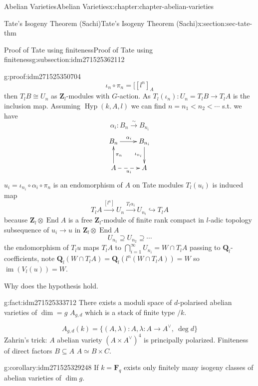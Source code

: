 \documentclass[oneside,10pt,]{book}
\numberwithin{equation}{section}
\newcommand{\lb}{[}
\newcommand{\ZZ}{\mathbf{Z}}
\newcommand{\QQ}{\mathbf{Q}}
\newcommand{\FF}{\mathbf{F}}
\DeclareMathOperator{\End}{End}
\DeclareMathOperator{\im}{im}
\newcommand{\lt}{<}
\begin{document}
\begin{chapterptx}{Abelian Varieties}{}{Abelian Varieties}{}{}{x:chapter:chapter-abelian-varieties}
\begin{sectionptx}{Tate's Isogeny Theorem (Sachi)}{}{Tate's Isogeny Theorem (Sachi)}{}{}{x:section:sec-tate-thm}
\begin{subsectionptx}{Proof of Tate using finiteness}{}{Proof of Tate using finiteness}{}{}{g:subsection:idm271525362112}
\begin{proofptx}{}{g:proof:idm271525350704}
\begin{equation*}
\iota_n \circ \pi_n  =  \lb [l^n]_A
\end{equation*}
then \(T_lB \cong U_n\) as \(\ZZ_l\)-modules with \(G\)-action. As \(T_l(\iota_n) \colon U_n =T_l B  \to T_l A\) is the inclusion map. Assuming \(\operatorname{Hyp}(k,A,l)\) we can find \(n = n_1 \lt n_2 \lt \cdots\) s.t. we have%
\begin{equation*}
\alpha_i \colon B_n \xrightarrow{\sim} B_{n_i}
\end{equation*}
%
\begin{equation*}
\xymatrix{
B_n \ar[r]^{\alpha_i} & B_{n_i} \ar[d]_{\iota_{n_i}}\\
A\ar[u]_{\pi_n} \ar@{-->}_{u_i}[r] & A
}
\end{equation*}
\(u_i = \iota_{n_i} \circ \alpha_i \circ \pi_n\) is an endomorphism of \(A\) on Tate modules \(T_l(u_i)\) is induced map%
\begin{equation*}
T_l A \xrightarrow{[l^n]} U_n \xrightarrow{T_l\alpha_i} U_{n_i} \hookrightarrow T_l A
\end{equation*}
because \(\ZZ_l \otimes \End A\) is a free \(\ZZ_l\)-module of finite rank compact in \(l\)-adic topology subsequence of \(u_i \to u\) in \(\ZZ_l \otimes \End A\)%
\begin{equation*}
U_{n_1} \supseteq U_{n_2} \supseteq \cdots
\end{equation*}
the endomorphism of \(T_l u\) maps \(T_l A\) to \(\bigcap_{i=1}^\infty U_{n_i} = W\cap T_l A\) passing to \(\QQ_l\)-coefficients, note \(\QQ_l(W\cap T_l A) = \QQ_l(l^n(W\cap T_l A)) = W\) so \(\im(V_l(u)) =W\).%
\end{proofptx}
Why does the hypothesis hold.%
\begin{fact}{}{}{g:fact:idm271525333712}%
There exists a moduli space of \(d\)-polarised abelian varieties of \(\dim = g\) \(A_{g,d}\) which is a stack of finite type \(/k\).%
\end{fact}
%
\begin{equation*}
A_{g,d}( k) = \{(A,\lambda) : A , \lambda \colon A \to A^\vee,\ \deg d \}
\end{equation*}
Zahrin's trick: \(A\) abelian variety \((A\times A^\vee)^4\) is principally polarized. Finiteness of direct factors \(B\subseteq A\) \(A\simeq B\times C\).%
\begin{corollary}{}{}{g:corollary:idm271525329248}%
If \(k = \FF_q\) exists only finitely many isogeny classes of abelian varieties of \(\dim g\).%
\end{corollary}

\end{subsectionptx}
\end{sectionptx}
\end{chapterptx}
\end{document}
